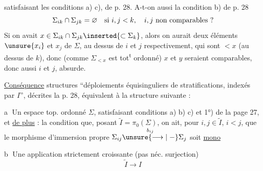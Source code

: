 satisfaisant les conditions a) c),  de p. 28.
A-t-on aussi la condition b) de p. 28
\[
\Sigma_{ik}\cap\Sigma_{jk}=\varnothing\quad\hbox{si }i,j<k,\quad
i,j\ \hbox{non comparables ?}
\]
Si on avait $x\in\Sigma_{ik}\cap\Sigma_{jk}\inserted{\subset\Sigma_k}$,
alors on aurait deux éléments $\unsure{x_i}$ et $x_j$ de $\Sigma$,
au dessus de $i$ et $j$ respectivement, qui sont $<x$
(au dessus de $k$), donc (comme $\Sigma_{<x}$ est tot\textsuperscript{t} ordonné)
 $x$ et $y$ seraient comparables, donc aussi
$i$ et $j$, absurde.

\uline{Conséquence}  structures ``déploiements
équisinguliers de stratifications, indexés par $I$'',
décrites  la p. 28, équivalent à la structure suivante :


\textcircled{a} Un \deleted{$\Sigma$} espace top. ordonné $\Sigma$,
satisfaisant  conditions a) b) c) et 1°) de la page 27,
et \uline{de plus} : la condition que, 
posant $\widetilde I=\pi_0(\Sigma)$, on ait, pour
$i,j\in\widetilde I$,
$i<j$, que le morphisme d'immersion
propre  $\Sigma_{ij}\overset{b_{ij}}{\unsure{\longrightarrow|\mathrel{-}}}\Sigma_j$ soit
\uline{mono}

\textcircled{b} Une application strictement croissante
(pas néc. surjection)
\[
\widetilde I\longrightarrow I
\]
